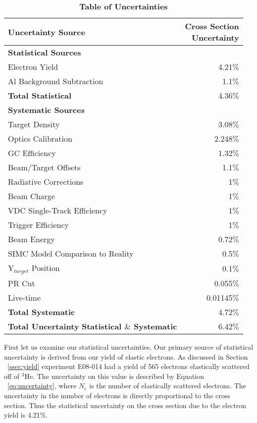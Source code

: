 \begin{table}[!h]
\centering
\begin{tabular}{|l | r |}
\hline
\textbf{Uncertainty Source} & \makecell{\textbf{Cross Section}\\ \textbf{Uncertainty}} \\
\hline
\textbf{Statistical Sources} &  \\ 
\hline
Electron Yield & 4.21$\%$\\
Al Background Subtraction & 1.1$\%$\\
\textbf{Total Statistical} &  4.36$\%$\\
\hline
\textbf{Systematic Sources} &  \\
\hline
Target Density & 3.08$\%$\\
Optics Calibration & 2.248$\%$\\
GC Efficiency & 1.32$\%$\\
Beam/Target Offsets & 1.1$\%$\\
Radiative Corrections & 1$\%$\\
Beam Charge & 1$\%$\\
VDC Single-Track Efficiency & 1$\%$\\
Trigger Efficiency & 1$\%$\\
Beam Energy & 0.72$\%$\\
SIMC Model Comparison to Reality & 0.5$\%$\\
Y$_{target}$ Position & 0.1$\%$\\
PR Cut & 0.055$\%$\\ 
Live-time & 0.01145$\%$\\
\textbf{Total Systematic} &  4.72$\%$\\
\hline
\makecell{\textbf{Total Uncertainty}\\ \textbf{Statistical $\&$ Systematic}} &  6.42$\%$\\
\hline
\end{tabular}
\caption{{\bf{Table of Uncertainties}} }
\label{tab:uncertainty}
\end{table}

First let us examine our statistical uncertainties. Our primary source of statistical uncertainty is derived from our yield of elastic electrons. As discussed in Section ~\ref{ssec:yield} experiment E08-014 had a yield of 565 electrons elastically scattered off of $^3$He. The uncertainty on this value is described by Equation ~\ref{eq:uncertainty}, where $N_e$ is the number of elastically scattered electrons. The uncertainty in the number of electrons is directly proportional to the cross section. Thus the statistical uncertainty on the cross section due to the electron yield is 4.21$\%$.

